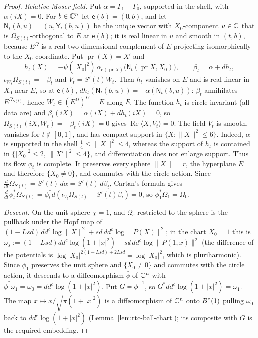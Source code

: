 \begin{proof}
\emph{Relative Moser field.} Put $\alpha=\Gamma_1-\Gamma_0$, supported in the shell, with $\alpha(iX)=0$. For $b\in\mathbb{C}^n$ let
$\mathsf e(b)=(0,b)$, and let $\mathsf N_t(b,u)=(u,\mathsf Y_t(b,u))$ be the unique vector with $X_0$-component $u\in\mathbb{C}$ that is
$\Omega_{S(t)}$-orthogonal to $E$ at $\mathsf e(b)$; it is real linear in $u$ and smooth in $(t,b)$, because $E^{\Omega}$ is a
real two-dimensional complement of $E$ projecting isomorphically to the $X_0$-coordinate. Put $\operatorname{pr}(X)=X'$ and
\[
 h_t(X)=-\psi(|X_0|^2)\,\alpha_{\mathsf e(\operatorname{pr}X)}\bigl(\mathsf N_t(\operatorname{pr}X,X_0)\bigr),\qquad \beta_t=\alpha+dh_t,
\]
$\iota_{W_t}\Omega_{S(t)}=-\beta_t$ and $V_t=S'(t)W_t$. Then $h_t$ vanishes on $E$ and is real linear in $X_0$ near $E$, so at
$\mathsf e(b)$, $dh_t(\mathsf N_t(b,u))=-\alpha(\mathsf N_t(b,u))$: $\beta_t$ annihilates $E^{\Omega_{S(t)}}$, hence
$W_t\in(E^{\Omega})^{\Omega}=E$ along $E$. The function $h_t$ is circle invariant (all data are) and $\beta_t(iX)=\alpha(iX)+dh_t(iX)=0$,
so $\Omega_{S(t)}(iX,W_t)=-\beta_t(iX)=0$ gives $\operatorname{Re}\langle X,V_t\rangle=0$. The field $V_t$ is smooth, vanishes for
$t\notin[0,1]$, and has compact support in $\{X:\|X\|^2\le6\}$. Indeed, $\alpha$ is supported in the shell
$\frac14\le\|X\|^2\le4$, whereas the support of $h_t$ is contained in
$\{|X_0|^2\le2,\ \|X'\|^2\le4\}$, and differentiation does not enlarge support. Thus its flow $\phi_t$ is
complete. It preserves every sphere $\|X\|=r$, the hyperplane $E$ and therefore $\{X_0\ne0\}$, and commutes with the circle
action. Since $\frac d{dt}\Omega_{S(t)}=S'(t)\,d\alpha=S'(t)\,d\beta_t$, Cartan's formula gives
$\frac d{dt}\phi_t^*\Omega_{S(t)}=\phi_t^*d(\iota_{V_t}\Omega_{S(t)}+S'(t)\beta_t)=0$, so $\phi_1^*\Omega_1=\Omega_0$.

\emph{Descent.} On the unit sphere $\chi=1$, and $\Omega_s$ restricted to the sphere is the pullback under the Hopf map of
$(1-Lsd)\,dd^c\log\|X\|^2+sd\,dd^c\log\|P(X)\|^2$; in the chart $X_0=1$ this is $\omega_s:=(1-Lsd)dd^c\log(1+|x|^2)+sd\,dd^c\log\|P(1,x)\|^2$
(the difference of the potentials is $\log|X_0|^{2(1-Lsd)+2Lsd}=\log|X_0|^2$, which is pluriharmonic). Since $\phi_1$ preserves the
unit sphere and $\{X_0\ne0\}$ and commutes with the circle action, it descends to a diffeomorphism $\bar\phi$ of $\mathbb{C}^n$ with
$\bar\phi^*\omega_1=\omega_0=dd^c\log(1+|x|^2)$. Put $G=\bar\phi^{-1}$, so $G^*dd^c\log(1+|x|^2)=\omega_1$. The map
$x\mapsto x/\sqrt{\pi(1+|x|^2)}$ is a diffeomorphism of $\mathbb{C}^n$ onto $B^{\circ}(1)$ pulling $\omega_0$ back to $dd^c\log(1+|x|^2)$
(Lemma~\ref{lem:rtc-ball-chart}); its composite with $G$ is the required embedding.
\end{proof}


